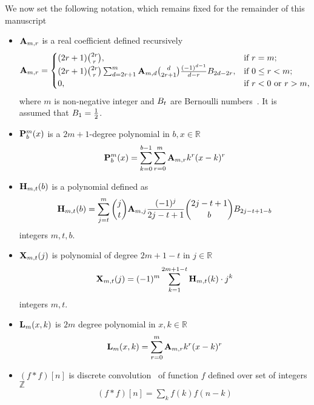 We now set the following notation, which remains fixed for the remainder of this manuscript
\begin{itemize}
    \setlength\itemsep{1.6em}
    \item ${\mathbf{A}} \sb{m,r}$ is a real coefficient defined recursively
    \begin{equation}
        \label{eq:def_coeff_a}
        {\mathbf{A}} \sb{m,r} =
        \begin{cases}
        (2r+1)
            \binom{2r}{r}, & \text{if } r=m; \\
            (2r+1) \binom{2r}{r} \sum_{d=2r+1}^{m} {\mathbf{A}} \sb{m,d} \binom{d}{2r+1} \frac{(-1)^{d-1}}{d-r}
            {B}\sb{2d-2r}, & \text{if } 0 \leq r<m; \\
            0, & \text{if } r<0 \text{ or } r>m,
        \end{cases}
    \end{equation}
    where $m$ is non-negative integer and ${B}\sb{t}$ are Bernoulli numbers~\cite{WeissteinBernoulli}.
    It is assumed that ${B}\sb{1}=\frac{1}{2}$.

    \item ${\mathbf{P}}\sp{m} \sb{b}(x)$ is a $2m+1$-degree polynomial in $b,x\in\mathbb{R}$
    \begin{equation}
        \label{eq:def_polynomial_p}
        {\mathbf{P}}\sp{m} \sb{b}(x) = \sum_{k=0}^{b-1} \sum_{r=0}^{m} {\mathbf{A}} \sb{m,r} k^r(x-k)^r
    \end{equation}

    \item ${\mathbf{H}} \sb{m,t} (b)$ is a polynomial defined as
    \begin{equation}
        \label{eq:def_coeff_h}
        {\mathbf{H}} \sb{m,t} (b)
        = \sum_{j=t}^{m} \binom{j}{t} {\mathbf{A}} \sb{m,j} \frac{(-1)^j}{2j-t+1} \binom{2j-t+1}{b} {B}\sb{2j-t+1-b}
    \end{equation}
    integers $m,t,b$.

    \item ${\mathbf{X}}\sb{m,t} (j)$ is polynomial of degree $2m+1-t$ in $j\in\mathbb{R}$
    \begin{equation}
        \label{eq:def_coeff_x}
        {\mathbf{X}}\sb{m,t} (j) = (-1)^m \sum_{k=1}^{2m+1-t} {\mathbf{H}} \sb{m,t} (k) \cdot j^k
    \end{equation}
    integers $m,t$.

    \item ${\mathbf{L}}\sb{m}(x,k)$ is $2m$ degree polynomial in $x,k\in\mathbb{R}$
    \begin{equation}
        \label{eq:def_polynomial_l}
        {\mathbf{L}}\sb{m}(x,k) = \sum_{r=0}^{m} {\mathbf{A}} \sb{m,r} k^r(x-k)^r
    \end{equation}

    \item $(f\ast f)[n]$ is discrete convolution~\cite{damelin_discrete_convolution} of function $f$ defined over set of integers $\mathbb{Z}$
    \begin{align*}
    (f\ast f)[n]
        = \sum_{k} f(k) f(n-k)
    \end{align*}
\end{itemize}
